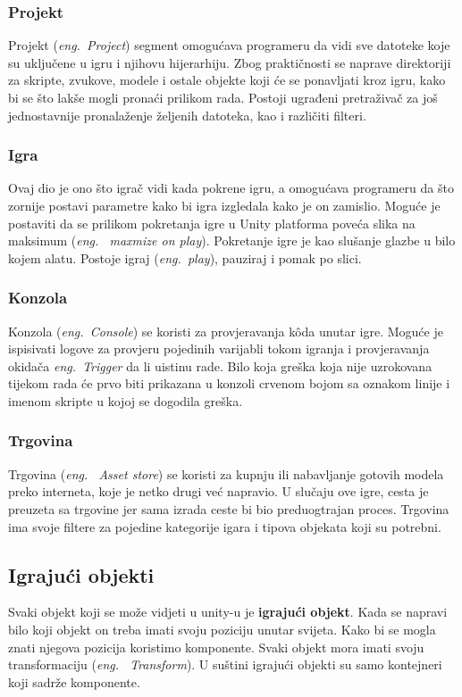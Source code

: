 \subsubsection{Projekt}
Projekt (\emph{eng.~Project}) segment omogućava programeru da vidi sve datoteke koje su uključene u igru i njihovu hijerarhiju. Zbog praktičnosti se naprave direktoriji za skripte, zvukove, modele i ostale objekte koji će se ponavljati kroz igru, kako bi se što lakše mogli pronaći prilikom rada. Postoji ugrađeni pretraživač za još jednostavnije pronalaženje željenih datoteka, kao i različiti filteri.

\subsubsection{Igra}
Ovaj dio je ono što igrač vidi kada pokrene igru, a omogućava programeru da što zornije postavi parametre kako bi igra izgledala kako je on zamislio. Moguće je postaviti da se prilikom pokretanja igre u Unity platforma poveća slika na maksimum (\emph{eng.~ maxmize on play}). Pokretanje igre je kao slušanje glazbe u bilo kojem alatu. Postoje igraj (\emph{eng.~play}), pauziraj i pomak po slici.

\subsubsection{Konzola}
Konzola (\emph{eng.~Console}) se koristi za provjeravanja k\^oda unutar igre. Moguće je ispisivati logove za provjeru pojedinih varijabli tokom igranja i provjeravanja okidača \emph{eng.~Trigger}  da li uistinu rade. Bilo koja greška koja nije uzrokovana tijekom rada će prvo biti prikazana u konzoli crvenom bojom sa oznakom linije i imenom skripte u kojoj se dogodila greška.

\subsubsection{Trgovina}
Trgovina (\emph{eng.~ Asset store}) se koristi za kupnju ili nabavljanje gotovih modela preko interneta, koje je netko drugi već napravio. U slučaju ove igre, cesta je preuzeta sa trgovine jer sama izrada ceste bi bio preduogtrajan proces. Trgovina ima svoje filtere za pojedine kategorije igara i tipova objekata koji su potrebni.

\subsection{Igrajući objekti}
Svaki objekt koji se može vidjeti u unity-u je \textbf{igrajući objekt}. Kada se napravi bilo koji objekt on treba imati svoju poziciju unutar svijeta. Kako bi se mogla znati njegova pozicija koristimo komponente. Svaki objekt mora imati svoju transformaciju (\emph{eng.~ Transform}). U suštini igrajući objekti su samo kontejneri koji sadrže komponente.

